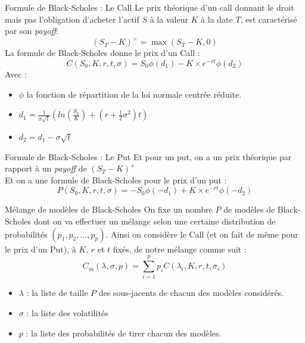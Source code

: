 \documentclass{beamer}
\begin{document}
\begin{frame}{Formule de Black-Scholes : Le Call}
Le prix théorique d'un call donnant le droit mais pas l'obligation d'acheter l'actif $S$ à la valeur $K$ à la date $T$, est caractérisé par son \textit{payoff}:
$$ (S_T - K)^{+} = \max (S_T -K,0) $$
La formule de Black-Scholes donne le prix d'un Call :
$$ C(S_0,K,r,t,\sigma) = S_0 \phi(d_1)-K \times e^{-rt} \phi(d_2) $$
Avec : \begin{itemize}
\item $\phi$ la fonction de répartition de la loi normale centrée réduite.
\item $d_1 = \frac{1}{\sigma \sqrt{t}} (ln(\frac{S_0}{K})+(r+\frac{1}{2}\sigma^2)t) $
\item $d_2 = d_1 - \sigma \sqrt{t}$
\end{itemize}
\end{frame}

\begin{frame}{Formule de Black-Scholes : Le Put}
Et pour un put, on a un prix théorique par rapport à un \textit{payoff} de $ (S_T - K)^{+}$
\\ \vspace{0.5cm}
Et on a une formule de Black-Scholes pour le prix d'un put :
$$ P(S_0,K,r,t,\sigma) = -S_0 \phi(-d_1)+K \times e^{-rt} \phi(-d_2) $$

\end{frame}

\begin{frame}{Mélange de modèles de Black-Scholes}
  On fixe un nombre $P$ de modèles de Black-Scholes dont on va effectuer un mélange selon une certaine distribution de probabilités $(p_1,p_2,...,p_p)$.
  \newline
  Ainsi on considère le Call (et on fait de même pour le prix d'un Put), à $K$, $r$ et $t$ fixés, de notre mélange comme suit :
  $$ C_m(\lambda, \sigma, p) = \sum^p_{i=1} p_i C(\lambda_i,K,r,t,\sigma_i) $$
\begin{itemize}
  \item $\lambda$ : la liste de taille $P$ des sous-jacents de chacun des modèles considérés.
  \item $\sigma$ : la liste des volatilités
  \item $p$ : la liste des probabilités de tirer chacun des modèles.
\end{itemize}
\end{frame}
\end{document}
